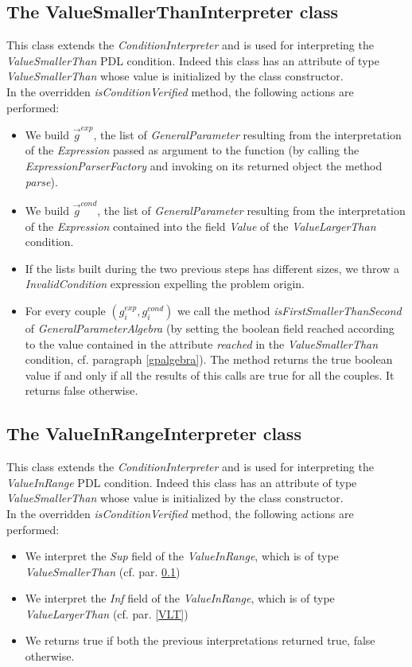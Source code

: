 \documentclass[a4paper,11pt] {ivoa}
\begin{document}
\subsection{The ValueSmallerThanInterpreter class}\label{VST}
This class extends the  {\it ConditionInterpreter} and is used for interpreting the {\it ValueSmallerThan} PDL condition. Indeed this class has an attribute of type {\it ValueSmallerThan} whose value is initialized by the class constructor. \\
In the overridden {\it isConditionVerified} method, the following actions are performed:
\begin{itemize}
\item We build $\vec g^{exp}$, the list of {\it GeneralParameter} resulting from the interpretation of the {\it Expression} passed as argument to the function (by calling the {\it ExpressionParserFactory} and invoking on its returned object the method {\it parse}).
\item We build $\vec g^{cond}$, the list of {\it GeneralParameter} resulting from the interpretation of the {\it Expression} contained into the field {\it Value} of the {\it ValueLargerThan} condition.
\item If the lists built during the two previous steps has different sizes, we throw a {\it InvalidCondition} expression expelling the problem origin. 
\item For every couple $(g_i^{exp}, g_i^{cond})$ we call the method  {\it isFirstSmallerThanSecond} of {\it GeneralParameterAlgebra} (by setting the boolean field reached according to the value contained in the attribute {\it reached} in the  {\it ValueSmallerThan} condition, cf. paragraph \ref{gpalgebra}). The method returns the true boolean value if and only if all the results of this calls are true for all the couples. It returns false otherwise. 
\end{itemize}

\subsection{The ValueInRangeInterpreter class}
This class extends the  {\it ConditionInterpreter} and is used for interpreting the {\it ValueInRange} PDL condition. Indeed this class has an attribute of type {\it ValueSmallerThan} whose value is initialized by the class constructor. \\
In the overridden {\it isConditionVerified} method, the following actions are performed:
\begin{itemize}
\item We interpret the {\it Sup} field of the  {\it ValueInRange}, which is of type {\it ValueSmallerThan} (cf. par. \ref{VST})
\item We interpret the {\it Inf} field of the  {\it ValueInRange}, which is of type {\it ValueLargerThan} (cf. par. \ref{VLT})
\item We returns true if both the previous interpretations returned true, false otherwise.
\end{itemize}
\end{document}
